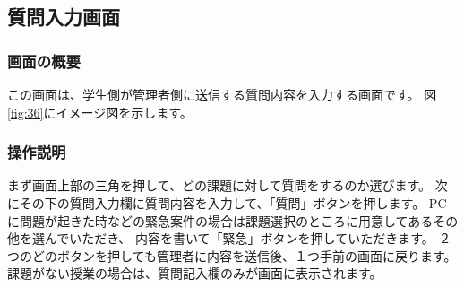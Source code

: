 \newpage



\subsection{質問入力画面}
\subsubsection{画面の概要}
この画面は、学生側が管理者側に送信する質問内容を入力する画面です。
図\ref{fig:36}にイメージ図を示します。

\subsubsection{操作説明}
まず画面上部の三角を押して、どの課題に対して質問をするのか選びます。
次にその下の質問入力欄に質問内容を入力して、「質問」ボタンを押します。
PCに問題が起きた時などの緊急案件の場合は課題選択のところに用意してあるその他を選んでいただき、
内容を書いて「緊急」ボタンを押していただきます。
２つのどのボタンを押しても管理者に内容を送信後、１つ手前の画面に戻ります。
課題がない授業の場合は、質問記入欄のみが画面に表示されます。



